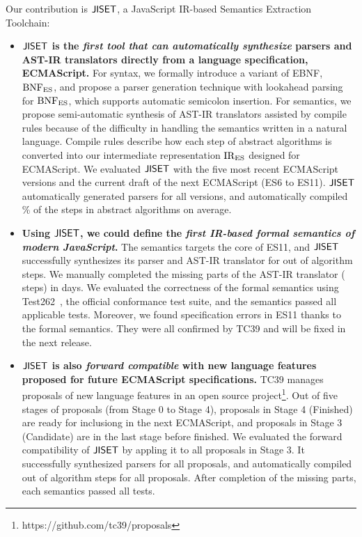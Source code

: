 Our contribution is \( \text{\sf JISET} \), a JavaScript IR-based Semantics Extraction
Toolchain:
\begin{itemize}[leftmargin=0.5cm]
  \item \textbf{\( \text{\sf JISET} \) is the \textit{first tool that can automatically synthesize}
    parsers and AST-IR translators directly from a language specification,
    ECMAScript.}  For syntax, we formally introduce a variant of EBNF, \( \text{BNF}_{\text{ES}} \),
    and propose a parser generation technique with
    lookahead parsing for \( \text{BNF}_{\text{ES}} \), which supports automatic semicolon
    insertion. For semantics, we propose semi-automatic synthesis of AST-IR
    translators assisted by compile rules because of the
    difficulty in handling the semantics written in a natural language.  Compile rules describe how
    each step of abstract algorithms is converted into our intermediate
    representation \( \text{IR}_\text{ES} \) designed for ECMAScript. We evaluated \( \text{\sf JISET} \)
    with the five most recent ECMAScript versions and the current draft of the next
    ECMAScript (ES6 to ES11).   \( \text{\sf JISET} \) automatically generated
    parsers for all versions, and automatically compiled
    \% of the steps in abstract algorithms on average.
  \item \textbf{ Using \( \text{\sf JISET} \), we could define the \textit{first IR-based
    formal semantics of modern JavaScript}.}  The semantics targets the
    core of ES11, and \( \text{\sf JISET} \) successfully synthesizes its
    parser and AST-IR translator for  out of 
    algorithm steps.  We manually completed the missing parts of the AST-IR
    translator ( steps) in  days.  We evaluated the correctness
    of the formal semantics using Test262~\cite{test262}, the official
    conformance test suite, and the semantics passed all 
    applicable tests.  Moreover, we found  specification errors in ES11
    thanks to the formal semantics.  They were all confirmed by TC39 and will be
    fixed in the next release.
  \item \textbf{\( \text{\sf JISET} \) is also \textit{forward compatible} with new language features
    proposed for future ECMAScript specifications.}  TC39 manages proposals of
    new language features in an open source
    project\footnote{https://github.com/tc39/proposals}.  Out of five stages
    of proposals (from Stage 0 to Stage 4), proposals in Stage 4 (Finished)
    are ready for inclusiong in the next ECMAScript, and proposals in
    Stage 3 (Candidate) are in the last stage before finished.  We
    evaluated the forward compatibility of \( \text{\sf JISET} \) by appling it
    to all  proposals in Stage 3. It successfully
    synthesized parsers for all proposals, and automatically
    compiled  out of  algorithm steps for all
    proposals.  After completion of the missing parts,
    each semantics passed all  tests.
\end{itemize}
